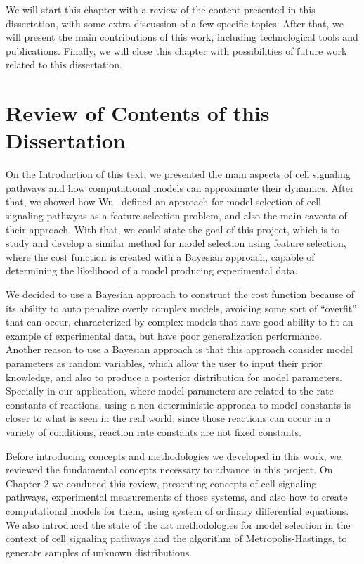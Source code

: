 We will start this chapter with a review of the content presented in 
this dissertation, with some extra discussion of a few specific topics.
After that, we will present the main contributions of this work,
including technological tools and publications. Finally, we will close
this chapter with possibilities of future work related to this
dissertation.


\section{Review of Contents of this Dissertation}
On the Introduction of this text, we presented the main aspects of cell
signaling pathways and how computational models can approximate their
dynamics. After that, we showed how Wu~\cite{Wu15} defined an approach
for model selection of cell signaling pathwyas as a feature selection
problem, and also the main caveats of their approach. With that, we
could state the goal of this project, which is to study and develop a
similar method for model selection using feature selection, where the 
cost function is created with a Bayesian approach, capable of
determining the likelihood of a model producing experimental data.


We decided to use a Bayesian approach to construct the cost function
because of its ability to auto penalize overly complex models, avoiding
some sort of ``overfit'' that can occur, characterized by complex models
that have good ability to fit an example of experimental data, but have 
poor generalization performance. Another reason to use a Bayesian
approach is that this approach consider model parameters as random 
variables, which allow the user to input their prior knowledge, and also
to produce a posterior distribution for model parameters. Specially in 
our application, where model parameters are related to the rate 
constants of reactions, using a non deterministic approach to model 
constants is closer to what is seen in the real world; since those 
reactions can occur in a variety of conditions, reaction rate constants
are not fixed constants.

Before introducing concepts and methodologies we developed in this work,
we reviewed the fundamental concepts necessary to advance in this 
project. On Chapter 2 we conduced this review, presenting concepts
of cell signaling pathways, experimental measurements of those systems, 
and also how to create computational models for them, using system of 
ordinary differential equations. We also introduced the state of the art
methodologies for model selection in the context of cell signaling
pathways and the algorithm of Metropolis-Hastings, to generate samples
of unknown distributions.

